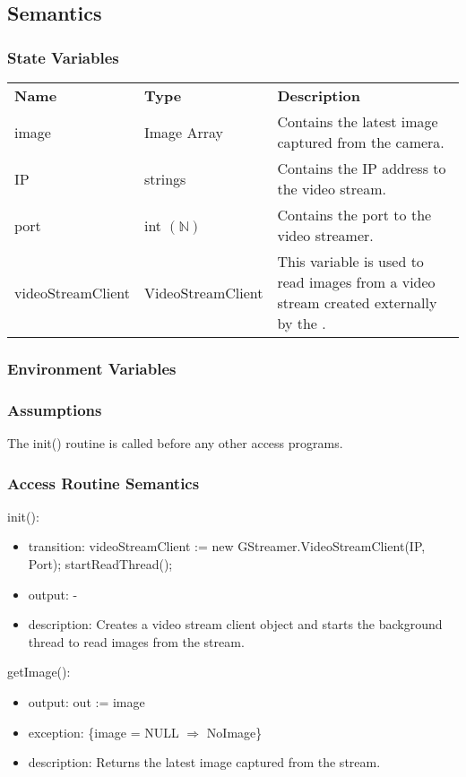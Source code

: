 \documentclass[12pt, titlepage]{article}
\begin{document}
\subsection{Semantics}
\subsubsection{State Variables}
\begin{center}
\begin{tabular}{p{3 cm} p{3.2cm} p{6.5cm} }
\hline
\textbf{Name} & \textbf{Type} & \textbf{Description}  \\
image & Image Array & Contains the latest image captured from the camera. \\
IP &  strings & Contains the IP address to the video stream. \\
port & int $(\mathbb{N})$ & Contains the port to the video streamer. \\
videoStreamClient & VideoStreamClient & This variable is used to read images from a video stream created externally by the \nameref{Drone Camera}.   \\
\hline
\hline
\end{tabular}
\end{center}
\subsubsection{Environment Variables}
\subsubsection{Assumptions}
The init() routine is called before any other access programs.
\subsubsection{Access Routine Semantics}
\noindent init():
\begin{itemize}
\item transition: videoStreamClient := new GStreamer.VideoStreamClient(IP, Port); startReadThread();
\item output: -
\item description: Creates a video stream client object and starts the background thread to read images from the stream.
\end{itemize}
\noindent getImage():
\begin{itemize}
\item output: out := image 
\item exception: \{image = NULL $\Rightarrow$ NoImage\}
\item description: Returns the latest image captured from the stream. 
\end{itemize}
\end{document}
